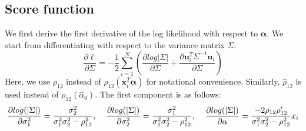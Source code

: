 \documentclass[aap,authoryear, preprint]{imsart}
\numberwithin{equation}{section}
\theoremstyle{plain}
\begin{document}
\subsection*{Score function}
We first derive the first derivative of the log likelihood with respect to $\bm{\alpha}$. We start from differentiating with respect to the variance matrix $\Sigma$. 
$$\frac{\partial \ell} {\partial \Sigma} =
-\frac{1}{2} \sum_{i=1}^{N} \left(
\frac{\partial log|\Sigma|}{\partial \Sigma} + 
\frac{\partial \bm{u}_i^T \Sigma^{-1}\bm{u}_i}{\partial \Sigma}
\right)
$$
Here, we use $\rho_{12}$ instead of $\rho_{12}(\bm{x}_i^T\bm{\alpha})$ for notational convenience. Similarly, $\hat{\rho}_{12}$ is used instead of ${\rho}_{12}(\hat{\alpha}_0).$
The first component is as follows:
$$\frac{\partial log(|\Sigma|)}{\partial \sigma_1^2}=
\frac{\sigma_2^2}{\sigma_1^2\sigma_2^2 - \rho_{12}^2}, \hspace{4mm}
\frac{\partial log(|\Sigma|)}{\partial \sigma_2^2} = \frac{\sigma_1^2}{\sigma_1^2\sigma_2^2 - \rho_{12}^2}, \hspace{4mm}
\frac{\partial log(|\Sigma|)}{\partial \alpha} =  \frac{-2\rho_{12}\rho_{12}'}{\sigma_1^2\sigma_2^2 - \rho_{12}^2}x_i$$
\end{document}
